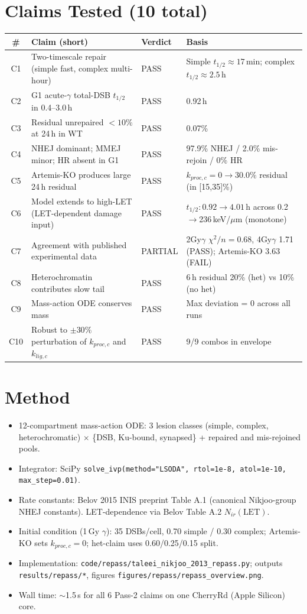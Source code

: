 \documentclass[11pt]{article}
\begin{document}
\section{Claims Tested (10 total)}
\begin{longtable}{clll}
\toprule
\# & Claim (short) & Verdict & Basis \\
\midrule
C1 & Two-timescale repair (simple fast, complex multi-hour) & PASS & Simple $t_{1/2}\approx17$\,min; complex $t_{1/2}\approx2.5$\,h \\
C2 & G1 acute-$\gamma$ total-DSB $t_{1/2}$ in 0.4--3.0\,h & PASS & 0.92\,h \\
C3 & Residual unrepaired $<10\%$ at 24\,h in WT & PASS & 0.07\% \\
C4 & NHEJ dominant; MMEJ minor; HR absent in G1 & PASS & 97.9\% NHEJ / 2.0\% mis-rejoin / 0\% HR \\
C5 & Artemis-KO produces large 24\,h residual & PASS & $k_{proc,c}=0 \to 30.0\%$ residual (in [15,35]\%) \\
C6 & Model extends to high-LET (LET-dependent damage input) & PASS & $t_{1/2}: 0.92\to4.01$\,h across 0.2$\to$236\,keV/$\mu$m (monotone) \\
C7 & Agreement with published experimental data & PARTIAL & 2Gy$\gamma$ $\chi^2/n{=}0.68$, 4Gy$\gamma$ 1.71 (PASS); Artemis-KO 3.63 (FAIL) \\
C8 & Heterochromatin contributes slow tail & PASS & 6\,h residual 20\% (het) vs 10\% (no het) \\
C9 & Mass-action ODE conserves mass & PASS & Max deviation = 0 across all runs \\
C10 & Robust to $\pm30\%$ perturbation of $k_{proc,c}$ and $k_{lig,c}$ & PASS & 9/9 combos in envelope \\
\bottomrule
\end{longtable}

\section{Method}
\begin{itemize}
  \item 12-compartment mass-action ODE: 3 lesion classes (simple, complex, heterochromatic) $\times$ \{DSB, Ku-bound, synapsed\} + repaired and mis-rejoined pools.
  \item Integrator: SciPy \texttt{solve\_ivp(method="LSODA", rtol=1e-8, atol=1e-10, max\_step=0.01)}.
  \item Rate constants: Belov 2015 INIS preprint Table A.1 (canonical Nikjoo-group NHEJ constants). LET-dependence via Belov Table A.2 $N_{ir}(\text{LET})$.
  \item Initial condition (1\,Gy $\gamma$): 35 DSBs/cell, 0.70 simple / 0.30 complex; Artemis-KO sets $k_{proc,c}=0$; het-claim uses 0.60/0.25/0.15 split.
  \item Implementation: \texttt{code/repass/taleei\_nikjoo\_2013\_repass.py}; outputs \texttt{results/repass/*}, figures \texttt{figures/repass/repass\_overview.png}.
  \item Wall time: $\sim$1.5\,s for all 6 Pass-2 claims on one CherryRd (Apple Silicon) core.
\end{itemize}
\end{document}
